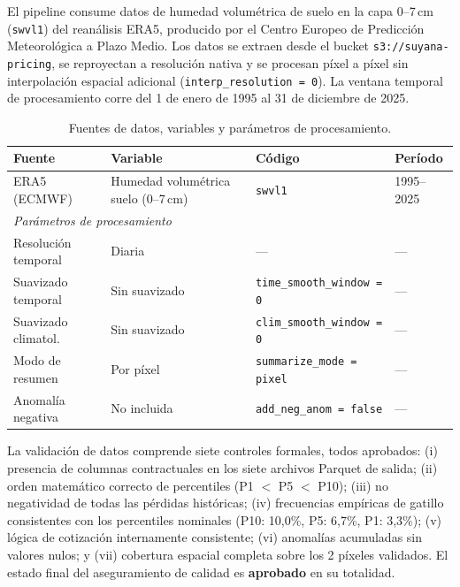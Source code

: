 \documentclass[11pt,a4paper]{article}
\begin{document}
El pipeline consume datos de humedad volumétrica de suelo en la capa 0--7\,cm (\texttt{swvl1}) del reanálisis ERA5, producido por el Centro Europeo de Predicción Meteorológica a Plazo Medio. Los datos se extraen desde el bucket \texttt{s3://suyana-pricing}, se reproyectan a resolución nativa y se procesan píxel a píxel sin interpolación espacial adicional (\texttt{interp\_resolution = 0}). La ventana temporal de procesamiento corre del 1 de enero de 1995 al 31 de diciembre de 2025.

\renewcommand{\arraystretch}{1.3}
\begin{table}[ht]
  \centering
  \caption{Fuentes de datos, variables y parámetros de procesamiento.}
  \label{tab:datos}
  \begin{tabular}{llll}
    \toprule
    \textbf{Fuente} & \textbf{Variable} & \textbf{Código} & \textbf{Período} \\
    \midrule
    ERA5 (ECMWF) & Humedad volumétrica suelo (0--7\,cm) & \texttt{swvl1} & 1995--2025 \\
    \midrule
    \multicolumn{4}{l}{\textit{Parámetros de procesamiento}} \\
    \midrule
    Resolución temporal  & Diaria           & ---            & --- \\
    Suavizado temporal   & Sin suavizado    & \texttt{time\_smooth\_window = 0}  & --- \\
    Suavizado climatol.  & Sin suavizado    & \texttt{clim\_smooth\_window = 0}  & --- \\
    Modo de resumen      & Por píxel        & \texttt{summarize\_mode = pixel}   & --- \\
    Anomalía negativa    & No incluida      & \texttt{add\_neg\_anom = false}    & --- \\
    \bottomrule
  \end{tabular}
\end{table}

La validación de datos comprende siete controles formales, todos aprobados: (i) presencia de columnas contractuales en los siete archivos Parquet de salida; (ii) orden matemático correcto de percentiles (P1 $<$ P5 $<$ P10); (iii) no negatividad de todas las pérdidas históricas; (iv) frecuencias empíricas de gatillo consistentes con los percentiles nominales (P10: 10,0\%, P5: 6,7\%, P1: 3,3\%); (v) lógica de cotización internamente consistente; (vi) anomalías acumuladas sin valores nulos; y (vii) cobertura espacial completa sobre los 2 píxeles validados. El estado final del aseguramiento de calidad es \textbf{aprobado} en su totalidad.
\end{document}
